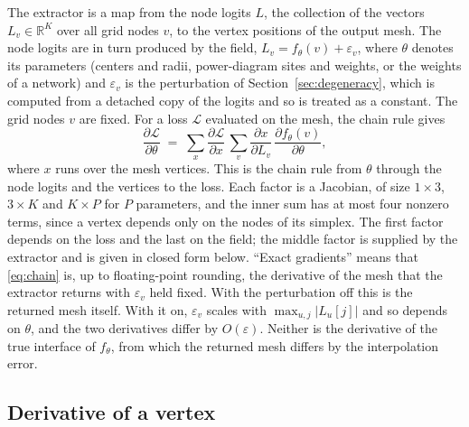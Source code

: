 \documentclass[11pt]{article}
\theoremstyle{definition}
\begin{document}
The extractor is a map from the node logits $L$, the collection of the
vectors $L_v \in \mathbb{R}^K$ over all grid nodes $v$, to the vertex
positions of the output mesh. The node logits are in turn produced by the field, $L_v = f_\theta(v) +
\varepsilon_v$, where $\theta$ denotes its parameters (centers and radii,
power-diagram sites and weights, or the weights of a network) and
$\varepsilon_v$ is the perturbation of Section~\ref{sec:degeneracy}, which is computed from a detached copy of the logits and so is treated as a constant. The grid nodes $v$ are fixed.
For a loss $\mathcal{L}$ evaluated on the mesh, the chain rule gives
\begin{equation}
  \frac{\partial \mathcal{L}}{\partial \theta}
  \;=\; \sum_{x} \frac{\partial \mathcal{L}}{\partial x}\,
        \sum_{v} \frac{\partial x}{\partial L_v}\,
        \frac{\partial f_\theta(v)}{\partial \theta},
  \label{eq:chain}
\end{equation}
where $x$ runs over the mesh vertices. This is the chain rule from $\theta$
through the node logits and the vertices to the loss. Each factor is a
Jacobian, of size $1\times3$, $3\times K$ and $K\times P$ for $P$ parameters,
and the inner sum has at most four nonzero terms, since a vertex depends only
on the nodes of its simplex. The first factor depends on the loss and the last
on the field; the middle factor is supplied by the extractor and
is given in closed form below. ``Exact gradients'' means that \eqref{eq:chain}
is, up to floating-point rounding, the derivative of the mesh that the
extractor returns with $\varepsilon_v$ held fixed. With the perturbation off
this is the returned mesh itself. With it on, $\varepsilon_v$ scales with
$\max_{u,j}|L_u[j]|$ and so depends on $\theta$, and the two derivatives
differ by $O(\varepsilon)$. Neither is the derivative of the true interface
of $f_\theta$, from which the returned mesh differs by the interpolation
error.

\subsection{Derivative of a vertex}
\end{document}
